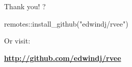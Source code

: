 \documentclass[
  ignorenonframetext,
]{beamer}
\newenvironment{Shaded}{\begin{snugshade}}{\end{snugshade}}
\newcommand{\FunctionTok}[1]{\textcolor[rgb]{0.00,0.00,0.00}{#1}}
\newcommand{\NormalTok}[1]{#1}
\newcommand{\SpecialCharTok}[1]{\textcolor[rgb]{0.00,0.00,0.00}{#1}}
\newcommand{\StringTok}[1]{\textcolor[rgb]{0.31,0.60,0.02}{#1}}
\begin{document}
\begin{frame}[fragile]{Thank you!}
\protect\hypertarget{thank-you}{}
\LargeInterested?

\begin{Shaded}
\begin{Highlighting}[]
\NormalTok{remotes}\SpecialCharTok{::}\FunctionTok{install\_github}\NormalTok{(}\StringTok{"edwindj/rvee"}\NormalTok{)}
\end{Highlighting}
\end{Shaded}

Or visit:

\textbf{\url{http://github.com/edwindj/rvee}}
\end{frame}
\end{document}
